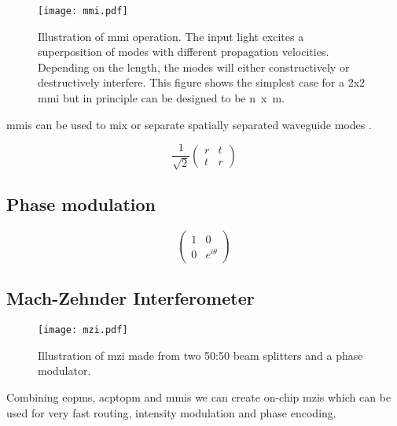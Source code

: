 \begin{figure}[t]
	\centering
	\texttt{[image: mmi.pdf]}
	\caption[Multi-mode interferometer operating principle]{Illustration of \acs{mmi} operation. The input light excites a superposition of modes with different propagation velocities. Depending on the length, the modes will either constructively or destructively interfere. This figure shows the simplest case for a \si{2x2} \acs{mmi} but in principle can be designed to be \si{n x m}.}
	\label{fig:mmi}
\end{figure}

\Acp{mmi} can be used to mix or separate spatially separated waveguide modes \cite{soldano1995optical}.

\begin{equation}
	\frac{1}{\sqrt{2}}\left(
	\begin{matrix}
	r & t\\
	t & r
	\end{matrix}
	\right)
\end{equation}

\subsection{Phase modulation}

\begin{equation}
	\left(
	\begin{matrix}
	1 & 0\\
	0 & e^{i\theta}
	\end{matrix}
	\right)
\end{equation}

\subsection{Mach-Zehnder Interferometer}

\begin{figure}[t]
	\centering
	\texttt{[image: mzi.pdf]}
	\caption[Mach-Zehnder interferometer schematic]{Illustration of \acs{mzi} made from two 50:50 beam splitters and a phase modulator.}
	\label{fig:mzi}
\end{figure}

Combining \acp{eopm}, acp{topm} and \acp{mmi} we can create on-chip \acp{mzi} which can be used for very fast routing, intensity modulation and phase encoding. 

